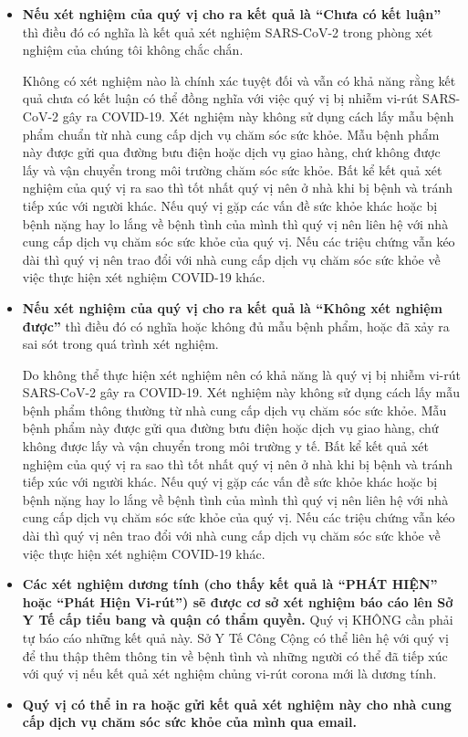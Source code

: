 \documentclass[10pt]{article}
\begin{document}
\begin{itemize}
\item

  \textbf{Nếu xét nghiệm của quý vị cho ra kết quả là ``Chưa có kết luận''} thì
  điều đó có nghĩa là kết quả xét nghiệm SARS-CoV-2 trong phòng xét nghiệm của
  chúng tôi không chắc chắn.

  Không có xét nghiệm nào là chính xác tuyệt đối và vẫn có khả năng rằng kết quả
  chưa có kết luận có thể đồng nghĩa với việc quý vị bị nhiễm vi-rút SARS-CoV-2
  gây ra COVID-19. Xét nghiệm này không sử dụng cách lấy mẫu bệnh phẩm chuẩn từ
  nhà cung cấp dịch vụ chăm sóc sức khỏe. Mẫu bệnh phẩm này được gửi qua đường
  bưu điện hoặc dịch vụ giao hàng, chứ không được lấy và vận chuyển trong môi
  trường chăm sóc sức khỏe. Bất kể kết quả xét nghiệm của quý vị ra sao thì tốt
  nhất quý vị nên ở nhà khi bị bệnh và tránh tiếp xúc với người khác. Nếu quý vị
  gặp các vấn đề sức khỏe khác hoặc bị bệnh nặng hay lo lắng về bệnh tình của
  mình thì quý vị nên liên hệ với nhà cung cấp dịch vụ chăm sóc sức khỏe của quý
  vị. Nếu các triệu chứng vẫn kéo dài thì quý vị nên trao đổi với nhà cung cấp
  dịch vụ chăm sóc sức khỏe về việc thực hiện xét nghiệm COVID-19 khác.

\item

  \textbf{Nếu xét nghiệm của quý vị cho ra kết quả là ``Không xét nghiệm được''}
  thì điều đó có nghĩa hoặc không đủ mẫu bệnh phẩm, hoặc đã xảy ra sai sót trong
  quá trình xét nghiệm.

  Do không thể thực hiện xét nghiệm nên có khả năng là quý vị bị nhiễm vi-rút
  SARS-CoV-2 gây ra COVID-19. Xét nghiệm này không sử dụng cách lấy mẫu bệnh
  phẩm thông thường từ nhà cung cấp dịch vụ chăm sóc sức khỏe. Mẫu bệnh phẩm này
  được gửi qua đường bưu điện hoặc dịch vụ giao hàng, chứ không được lấy và vận
  chuyển trong môi trường y tế. Bất kể kết quả xét nghiệm của quý vị ra sao thì
  tốt nhất quý vị nên ở nhà khi bị bệnh và tránh tiếp xúc với người khác. Nếu
  quý vị gặp các vấn đề sức khỏe khác hoặc bị bệnh nặng hay lo lắng về bệnh tình
  của mình thì quý vị nên liên hệ với nhà cung cấp dịch vụ chăm sóc sức khỏe của
  quý vị. Nếu các triệu chứng vẫn kéo dài thì quý vị nên trao đổi với nhà cung
  cấp dịch vụ chăm sóc sức khỏe về việc thực hiện xét nghiệm COVID-19 khác.

\item

  \textbf{Các xét nghiệm dương tính (cho thấy kết quả là ``PHÁT HIỆN'' hoặc
  ``Phát Hiện Vi-rút'') sẽ được cơ sở xét nghiệm báo cáo lên Sở Y Tế cấp tiểu
  bang và quận có thẩm quyền.} Quý vị KHÔNG cần phải tự báo cáo những kết quả
  này. Sở Y Tế Công Cộng có thể liên hệ với quý vị để thu thập thêm thông tin
  về bệnh tình và những người có thể đã tiếp xúc với quý vị nếu kết quả xét
  nghiệm chủng vi-rút corona mới là dương tính.

\item

  \textbf{Quý vị có thể in ra hoặc gửi kết quả xét nghiệm này cho nhà cung cấp
  dịch vụ chăm sóc sức khỏe của mình qua email.}

\end{itemize}
\end{document}

